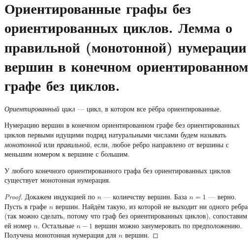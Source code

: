 \section{Ориентированные графы без ориентированных циклов. Лемма о правильной (монотонной) нумерации вершин в конечном ориентированном графе без циклов.}

\begin{definition}
    \textit{Ориентированный цикл} --- цикл, в котором все рёбра ориентированные.
\end{definition}

\begin{definition}
    Нумерацию вершин в конечном ориентированном графе без ориентированных циклов первыми идущими подряд натуральными числами будем называть \textit{монотонной} или \textit{правильной}, если, любое ребро направлено от вершины с меньшим номером к вершине с большим. 
\end{definition}

\begin{lemma}
    У любого конечного ориентированного графа без ориентированных циклов существует монотонная нумерация.
\end{lemma}

\begin{proof}
    Докажем индукцией по $n$ --- колиечству вершин. База $n=1$ --- верно. Пусть в графе $n$ вершин. Найдём такую, из которой не выходит ни одного ребра (так можно сделать, потому что граф без ориентированных циклов), сопоставим ей номер $n$. Остальные $n-1$ вершин можно занумеровать по предположению. Получена монотонная нумерация для $n$ вершин.
\end{proof}